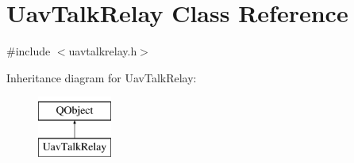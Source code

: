 \hypertarget{class_uav_talk_relay}{\section{Uav\-Talk\-Relay Class Reference}
\label{class_uav_talk_relay}
}


{\ttfamily \#include $<$uavtalkrelay.\-h$>$}

Inheritance diagram for Uav\-Talk\-Relay\-:\begin{figure}[H]
\begin{center}
\leavevmode
\includegraphics[height=2.000000cm]{class_uav_talk_relay}
\end{center}
\end{figure}
